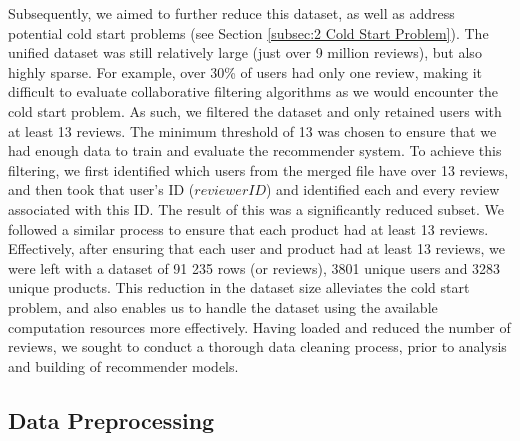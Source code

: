 Subsequently, we aimed to further reduce this dataset, as well as address potential cold start problems (see Section \ref{subsec:2 Cold Start Problem}). The unified dataset was still relatively  large (just over 9 million reviews), but also highly sparse. For example, over 30\% of users had only one review, making it difficult to evaluate collaborative filtering algorithms as we would encounter the cold start problem. As such, we filtered the dataset and only retained users with at least 13 reviews. The minimum threshold of 13 was chosen to ensure that we had enough data to train and evaluate the recommender system. To achieve this filtering, we first identified which users from the merged file have over 13 reviews, and then took that user’s ID ($reviewerID$) and identified each and every review associated with this ID. The result of this was a significantly reduced subset. We followed a similar process to ensure that each product had at least 13 reviews. Effectively, after ensuring that each user and product had at least 13 reviews, we were left with a dataset of 91 235 rows (or reviews), 3801 unique users and 3283 unique products. This reduction in the dataset size alleviates the cold start problem, and also enables us to handle the dataset using the available computation resources more effectively. Having loaded and reduced the number of reviews, we sought to conduct a thorough data cleaning process, prior to analysis and building of recommender models.


\subsection{Data Preprocessing}
\label{subsec:3 Data Preprocessing}

